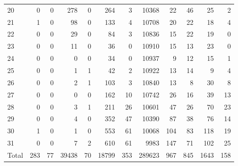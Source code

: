 \begin{table}
\begin{tabular}{lrrrrrrrrrrr}
20 & 0 & 0 & 278 & 0 & 264 & 3 & 10368 & 22 & 46 & 25 & 2 \\
21 & 1 & 0 & 98 & 0 & 133 & 4 & 10708 & 20 & 22 & 18 & 4 \\
22 & 0 & 0 & 29 & 0 & 84 & 3 & 10836 & 15 & 22 & 19 & 0 \\
23 & 0 & 0 & 11 & 0 & 36 & 0 & 10910 & 15 & 13 & 23 & 0 \\
24 & 0 & 0 & 0 & 0 & 34 & 0 & 10937 & 9 & 12 & 15 & 1 \\
25 & 0 & 0 & 1 & 1 & 42 & 2 & 10922 & 13 & 14 & 9 & 4 \\
26 & 0 & 0 & 2 & 1 & 103 & 3 & 10840 & 13 & 8 & 30 & 8 \\
27 & 0 & 0 & 0 & 0 & 162 & 10 & 10742 & 26 & 16 & 39 & 13 \\
28 & 0 & 0 & 3 & 1 & 211 & 26 & 10601 & 47 & 26 & 70 & 23 \\
29 & 0 & 0 & 4 & 0 & 352 & 47 & 10390 & 87 & 38 & 76 & 14 \\
30 & 1 & 0 & 1 & 0 & 553 & 61 & 10068 & 104 & 83 & 118 & 19 \\
31 & 0 & 0 & 7 & 2 & 610 & 61 & 9983 & 147 & 71 & 102 & 25 \\
Total & 283 & 77 & 39438 & 70 & 18799 & 353 & 289623 & 967 & 845 & 1643 & 158 \\
\end{tabular}
\end{table}

